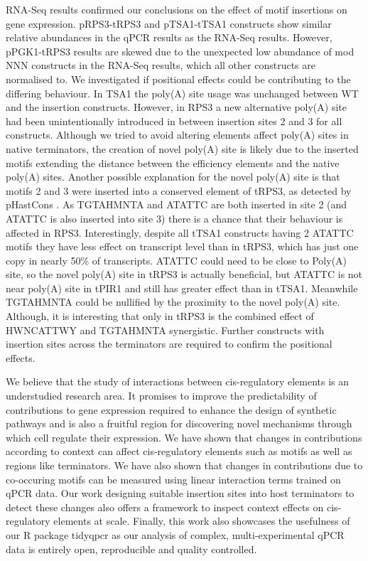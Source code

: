 \documentclass[../main.tex]{subfiles}
\begin{document}
RNA-Seq results confirmed our conclusions on the effect of motif insertions on gene expression. pRPS3-tRPS3 and pTSA1-tTSA1 constructs show similar relative abundances in the qPCR results as the RNA-Seq results. 
However, pPGK1-tRPS3 results are skewed due to the unexpected low abundance of mod NNN constructs in the RNA-Seq results, which all other constructs are normalised to.
We investigated if positional effects could be contributing to the differing behaviour. 
In TSA1 the poly(A) site usage was unchanged between WT and the insertion constructs. 
However, in RPS3 a new alternative poly(A) site had been unintentionally introduced in between insertion sites 2 and 3 for all constructs. 
Although we tried to avoid altering elements affect poly(A) sites in native terminators, the creation of novel poly(A) site is likely due to the inserted motifs extending the distance between the efficiency elements and the native poly(A) sites.
Another possible explanation for the novel poly(A) site is that motifs 2 and 3 were inserted into a conserved element of tRPS3, as detected by pHastCons \parencite{Siepel2005}.
As TGTAHMNTA and ATATTC are both inserted in site 2 (and ATATTC is also inserted into site 3) there is a chance that their behaviour is affected in RPS3.
Interestingly, despite all tTSA1 constructs having 2 ATATTC motifs they have less effect on transcript level than in tRPS3, which has just one copy in nearly 50\% of transcripts.
ATATTC could need to be close to Poly(A) site, so the novel poly(A) site in tRPS3 is actually beneficial, but ATATTC is not near poly(A) site in tPIR1 and still has greater effect than in tTSA1.
Meanwhile TGTAHMNTA could be nullified by the proximity to the novel poly(A) site.
Although, it is interesting that only in tRPS3 is the combined effect of HWNCATTWY and TGTAHMNTA synergistic.
Further constructs with insertion sites across the terminators are required to confirm the positional effects.

We believe that the study of interactions between cis-regulatory elements is an understudied research area. 
It promises to improve the predictability of contributions to gene expression required to enhance the design of synthetic pathways and is also a fruitful region for discovering novel mechanisms through which cell regulate their expression. 
We have shown that changes in contributions according to context can affect cis-regulatory elements such as motifs as well as regions like terminators. 
We have also shown that changes in contributions due to co-occuring motifs can be measured using linear interaction terms trained on qPCR data. 
Our work designing suitable insertion sites into host terminators to detect these changes also offers a framework to inspect context effects on cis-regulatory elements at scale. 
Finally, this work also showcases the usefulness of our R package tidyqpcr as our analysis of complex, multi-experimental qPCR data is entirely open, reproducible and quality controlled.
\end{document}
